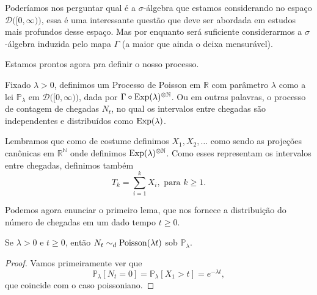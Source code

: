 \documentclass[../Notas_de_aula.tex]{subfiles}
\begin{document}
\begin{topics}
Poderíamos nos perguntar qual é a $\sigma$-álgebra que estamos considerando no espaço $\mathcal{D}\big( [0, \infty) \big)$, essa é uma interessante questão que deve ser abordada em estudos mais profundos desse espaço.
Mas por enquanto será suficiente considerarmos a $\sigma$-álgebra induzida pelo mapa $\Gamma$ (a maior que ainda o deixa mensurável).

Estamos prontos agora pra definir o nosso processo.

\begin{definition}
  Fixado $\lambda > 0$, definimos um Processo de Poisson em $\mathbb{R}$ com parâmetro $\lambda$ como a lei $\mathbb{P}_\lambda$ em $\mathcal{D}\big( [0, \infty) \big)$, dada por $\Gamma \circ \operatorname{Exp}(\lambda)^{\otimes \mathbb{N}}$.
  Ou em outras palavras, o processo de contagem de chegadas $N_t$, no qual os intervalos entre chegadas são independentes e distribuídos como $\operatorname{Exp}(\lambda)$.
\end{definition}

Lembramos que como de costume definimos $X_1, X_2, \dots$ como sendo as projeções canônicas em $\mathbb{R}^\mathbb{N}$ onde definimos $\operatorname{Exp}(\lambda)^{\otimes \mathbb{N}}$.
Como esses representam os intervalos entre chegadas, definimos também
\begin{equation}
  T_k = \sum_{i=1}^k X_i, \text{ para $k \geq 1$}.
\end{equation}

Podemos agora enunciar o primeiro lema, que nos fornece a distribuição do número de chegadas em um dado tempo $t \geq 0$.

\begin{lemma}
  Se $\lambda > 0$ e $t \geq 0$, então $N_t \sim_d \operatorname{Poisson}(\lambda t)$ sob $\mathbb{P}_\lambda$.
\end{lemma}

\begin{proof}
  Vamos primeiramente ver que
  \begin{equation}
    \mathbb{P}_\lambda [N_t = 0] = \mathbb{P}_\lambda[X_1 > t] = e^{-\lambda t},
  \end{equation}
  que coincide com o caso poissoniano.


\end{proof}
\end{topics}
\end{document}
